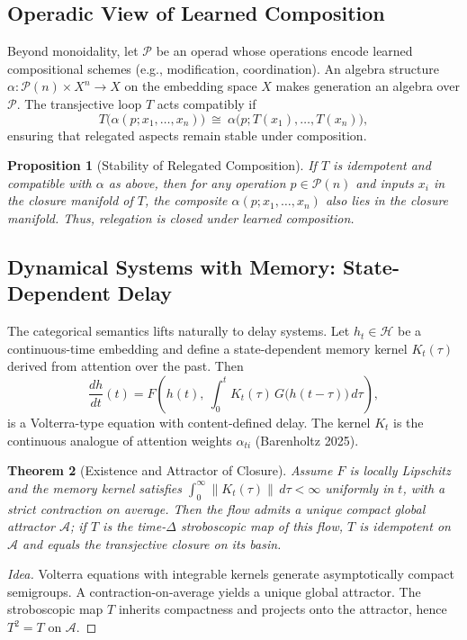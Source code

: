 \documentclass[12pt,a4paper,twoside,openright]{book}
\newtheorem{theorem}{Theorem}
\newtheorem{proposition}[theorem]{Proposition}
\begin{document}
\subsection{Operadic View of Learned Composition}
Beyond monoidality, let $\mathcal{P}$ be an operad whose operations encode learned compositional schemes (e.g., modification, coordination). An algebra structure $\alpha:\mathcal{P}(n)\times X^n\to X$ on the embedding space $X$ makes generation an algebra over $\mathcal{P}$. The transjective loop $T$ acts compatibly if
\[
T\big(\alpha(p;x_1,\ldots,x_n)\big)\ \cong\ \alpha\big(p;T(x_1),\ldots,T(x_n)\big),
\]
ensuring that relegated aspects remain stable under composition.

\begin{proposition}[Stability of Relegated Composition]
If $T$ is idempotent and compatible with $\alpha$ as above, then for any operation $p\in\mathcal{P}(n)$ and inputs $x_i$ in the closure manifold of $T$, the composite $\alpha(p;x_1,\ldots,x_n)$ also lies in the closure manifold. Thus, relegation is closed under learned composition.
\end{proposition}

\subsection{Dynamical Systems with Memory: State-Dependent Delay}
The categorical semantics lifts naturally to delay systems. Let $h_t\in\mathcal{H}$ be a continuous-time embedding and define a state-dependent memory kernel $K_t(\tau)$ derived from attention over the past. Then
\[
\frac{dh}{dt}(t)=F\!\left(h(t),\ \int_0^t K_t(\tau)\,G\big(h(t-\tau)\big)\,d\tau\right),
\]
is a Volterra-type equation with content-defined delay. The kernel $K_t$ is the continuous analogue of attention weights $\alpha_{ti}$ (Barenholtz 2025).

\begin{theorem}[Existence and Attractor of Closure]
Assume $F$ is locally Lipschitz and the memory kernel satisfies $\int_0^\infty \|K_t(\tau)\|\,d\tau<\infty$ uniformly in $t$, with a strict contraction on average. Then the flow admits a unique compact global attractor $\mathcal{A}$; if $T$ is the time-$\Delta$ stroboscopic map of this flow, $T$ is idempotent on $\mathcal{A}$ and equals the transjective closure on its basin.
\end{theorem}

\begin{proof}[Idea]
Volterra equations with integrable kernels generate asymptotically compact semigroups. A contraction-on-average yields a unique global attractor. The stroboscopic map $T$ inherits compactness and projects onto the attractor, hence $T^2=T$ on $\mathcal{A}$.
\end{proof}
\end{document}
